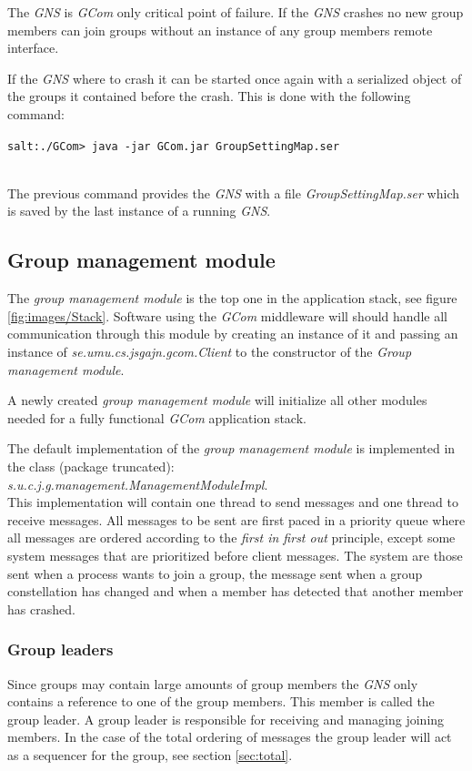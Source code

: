 \documentclass[titlepage, twocolumn, a4paper, 10pt]{article}
\begin{document}
The \textit{GNS} is \textit{GCom} only critical point of failure. If
the \textit{GNS} crashes no new group members can join groups without
an instance of any group members remote interface.

If the \textit{GNS} where to crash it can be started once again with
a serialized object of the groups it contained before the crash. This
is done with the following command:\\
\begin{footnotesize}
  \verb!salt:./GCom> java -jar GCom.jar GroupSettingMap.ser!
\end{footnotesize}\\
The previous command provides the \textit{GNS} with a file
\textit{GroupSettingMap.ser} which is saved by the last instance of a
running \textit{GNS}.

\subsection{Group management module}\label{sec:group-management-module}
The \textit{group management module} is the top one in the application
stack, see figure \ref{fig:images/Stack}. Software using the
\textit{GCom} middleware will should handle all communication through
this module by creating an instance of it and passing an instance of
\textit{se.umu.cs.jsgajn.gcom.Client} to the constructor of the
\textit{Group management module}.

A newly created \textit{group management module} will initialize all
other modules needed for a fully functional \textit{GCom} application
stack.

The default implementation of the \textit{group management module} is
implemented in the class (package truncated):\\
\textit{s.u.c.j.g.management.ManagementModuleImpl}.\\
This implementation will contain one thread to send messages and one
thread to receive messages. All messages to be sent are first paced in
a priority queue where all messages are ordered according to the
\textit{first in first out} principle, except some system messages
that are prioritized before client messages. The system are those sent
when a process wants to join a group, the message sent when a group
constellation has changed and when a member has detected that another
member has crashed.

\subsubsection{Group leaders}\label{sec:group-leaders}
Since groups may contain large amounts of group members the
\textit{GNS} only contains a reference to one of the group members.
This member is called the group leader. A group leader is responsible
for receiving and managing joining members. In the case of the total
ordering of messages the group leader will act as a sequencer for the
group, see section \ref{sec:total}.
\end{document}
